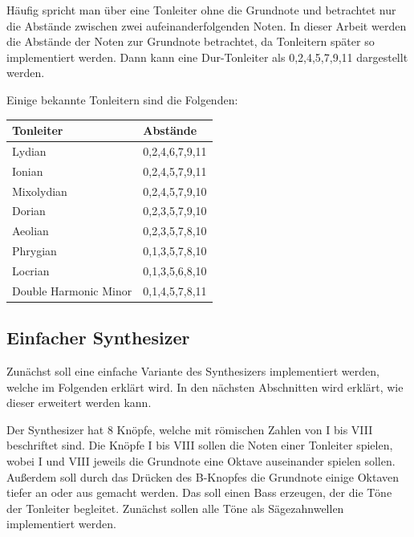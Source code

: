 Häufig spricht man über eine Tonleiter ohne die Grundnote
und betrachtet nur die Abstände zwischen zwei aufeinanderfolgenden Noten. 
In dieser Arbeit werden die Abstände der Noten zur Grundnote betrachtet, da
Tonleitern später so implementiert werden.
Dann kann eine Dur-Tonleiter als 0,2,4,5,7,9,11 dargestellt werden.

Einige bekannte Tonleitern sind die Folgenden:
\begin{center}
\begin{tabular}{|l|l|}
\hline
Tonleiter & Abstände \\
\hline
Lydian     & 0,2,4,6,7,9,11 \\
Ionian     & 0,2,4,5,7,9,11 \\
Mixolydian & 0,2,4,5,7,9,10 \\
Dorian     & 0,2,3,5,7,9,10 \\
Aeolian    & 0,2,3,5,7,8,10 \\
Phrygian   & 0,1,3,5,7,8,10 \\
Locrian    & 0,1,3,5,6,8,10 \\
Double Harmonic Minor & 0,1,4,5,7,8,11 \\
\hline
\end{tabular}
\end{center}

\subsection{Einfacher Synthesizer}
\label{chap:simple_synth}

Zunächst soll eine einfache Variante des Synthesizers implementiert
werden, welche im Folgenden erklärt wird. In den nächsten Abschnitten 
wird erklärt, wie dieser erweitert werden kann.

Der Synthesizer hat 8 Knöpfe, welche mit römischen Zahlen von I bis VIII beschriftet sind.
Die Knöpfe I bis VIII sollen die Noten einer Tonleiter spielen, wobei I und VIII jeweils
die Grundnote eine Oktave auseinander spielen sollen. Außerdem soll durch das Drücken 
des B-Knopfes die Grundnote einige Oktaven tiefer an oder aus gemacht werden. 
Das soll einen Bass erzeugen, der die Töne der Tonleiter begleitet.
Zunächst sollen alle Töne als Sägezahnwellen implementiert werden.

